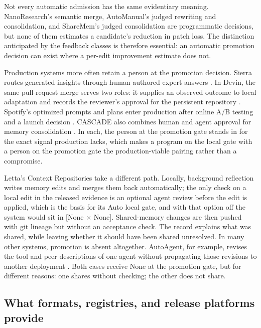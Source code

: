 Not every automatic admission has the same evidentiary meaning. NanoResearch's semantic merge, AutoManual's judged rewriting and consolidation, and ShareMem's judged consolidation are programmatic decisions, but none of them estimates a candidate's reduction in patch loss. The distinction anticipated by the feedback classes is therefore essential: an automatic promotion decision can exist where a per-edit improvement estimate does not.

Production systems more often retain a person at the promotion decision. Sierra routes generated insights through human-authored expert answers \citep{sierra2025os20}. In Devin, the same pull-request merge serves two roles: it supplies an observed outcome to local adaptation and records the reviewer's approval for the persistent repository \citep{cognition2025devinreview}. Spotify's optimized prompts and plans enter production after online A/B testing and a launch decision \citep{palumbo2026spotify}. CASCADE also combines human and agent approval for memory consolidation \citep{huang2025cascade}. In each, the person at the promotion gate stands in for the exact signal production lacks, which makes a program on the local gate with a person on the promotion gate the production-viable pairing rather than a compromise.

Letta's Context Repositories take a different path. Locally, background reflection writes memory edits and merges them back automatically; the only check on a local edit in the released evidence is an optional agent review before the edit is applied, which is the basis for its Auto local gate, and with that option off the system would sit in {[}None × None{]}. Shared-memory changes are then pushed with git lineage but without an acceptance check. The record explains what was shared, while leaving whether it should have been shared unresolved. In many other systems, promotion is absent altogether. AutoAgent, for example, revises the tool and peer descriptions of one agent without propagating those revisions to another deployment \citep{wang2026autoagent}. Both cases receive None at the promotion gate, but for different reasons: one shares without checking; the other does not share.

\subsection{What formats, registries, and release platforms provide}\label{what-formats-registries-and-release-platforms-provide}

